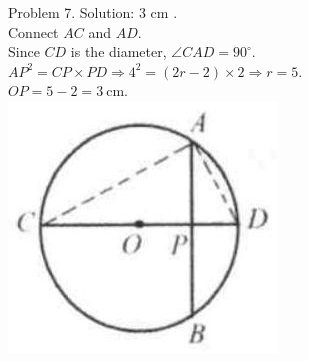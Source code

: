\documentclass[10pt]{article}
\begin{document}
Problem 7. Solution: 3 cm .\\
Connect \(A C\) and \(A D\).\\
Since \(C D\) is the diameter, \(\angle C A D=90^{\circ}\).\\
\(A P^{2}=C P \times P D \Rightarrow 4^{2}=(2 r-2) \times 2 \Rightarrow r=5\).\\
\(O P=5-2=3 \mathrm{~cm}\).\\
\includegraphics[max width=\textwidth, center]{2025_04_17_97bc1f7e44d93c271a88g-173(3)}
\end{document}
